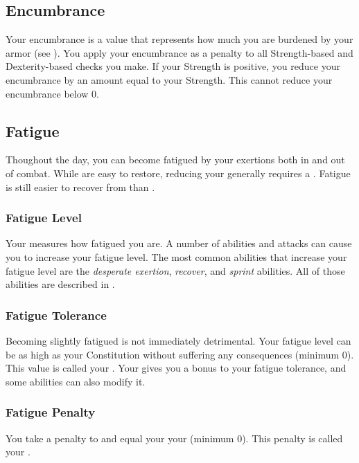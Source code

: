     \subsection{Encumbrance}\label{Encumbrance}
        Your encumbrance is a value that represents how much you are burdened by your armor (see ).
        You apply your encumbrance as a penalty to all Strength-based and Dexterity-based checks you make.
        If your Strength is positive, you reduce your encumbrance by an amount equal to your Strength.
        This cannot reduce your encumbrance below 0.

    \subsection{Fatigue}\label{Fatigue}
        Thoughout the day, you can become fatigued by your exertions both in and out of combat.
        While  are easy to restore, reducing your  generally requires a .
        Fatigue is still easier to recover from than .

        \subsubsection{Fatigue Level}\label{Fatigue Level}
            Your  measures how fatigued you are.
            A number of abilities and attacks can cause you to increase your fatigue level.
            The most common abilities that increase your fatigue level are the \textit{desperate exertion}, \textit{recover}, and \textit{sprint} abilities.
            All of those abilities are described in .

        \subsubsection{Fatigue Tolerance}\label{Fatigue Tolerance}
            Becoming slightly fatigued is not immediately detrimental.
            Your fatigue level can be as high as your Constitution without suffering any consequences (minimum 0).
            This value is called your .
            Your  gives you a bonus to your fatigue tolerance, and some abilities can also modify it.

        \subsubsection{Fatigue Penalty}\label{Fatigue Penalty}
            You take a penalty to  and  equal your  \sub your  (minimum 0).
            This penalty is called your .


